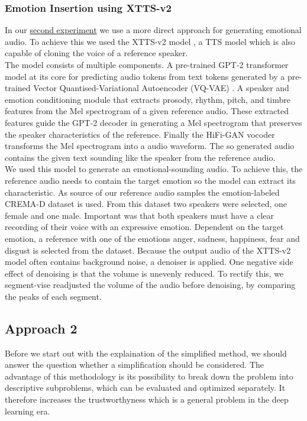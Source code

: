 \documentclass[11pt]{article}
\begin{document}
\subsubsection{Emotion Insertion using XTTS-v2}
In our \hyperref[Experiment 2]{second experiment} we use a more direct approach for generating emotional audio. To achieve this we used the XTTS-v2 model \cite{casanova2024xtts}, a TTS model which is also capable of cloning the voice of a reference speaker. \\
The model consists of multiple components. A pre-trained GPT-2 transformer model \cite{radford2019language} at its core for predicting audio tokens from text tokens generated by a pre-trained Vector Quantised-Variational Autoencoder (VQ-VAE) \cite{betker2023better, NIPS2017_7a98af17}. A speaker and emotion conditioning module that extracts prosody, rhythm, pitch, and timbre features from the Mel spectrogram of a given reference audio. These extracted features guide the GPT-2 decoder in generating a Mel spectrogram that preserves the speaker characteristics of the reference. Finally the HiFi-GAN \cite{kong2020hifi} vocoder transforms the Mel spectrogram into a audio waveform. The so generated audio contains the given text sounding like the speaker from the reference audio. \\ 
We used this model to generate an emotional-sounding audio. To achieve this, the reference audio needs to contain the target emotion so the model can extract its characteristic. As source of our reference audio samples the emotion-labeled CREMA-D \cite{cao_data} dataset is used. From this dataset two speakers were selected, one female and one male. Important was that both speakers must have a clear recording of their voice with an expressive emotion. Dependent on the target emotion, a reference with one of the emotions anger, sadness, happiness, fear and disgust is selected from the dataset. Because the output audio of the XTTS-v2 model often contains background noise, a denoiser is applied. One negative side effect of denoising is that the volume is unevenly reduced. To rectify this, we segment-vise readjusted the volume of the audio before denoising, by comparing the peaks of each segment.

\subsection{Approach 2}

Before we start out with the explaination of the simplified method, we should answer the question whether a simplification should be considered. The advantage of this methodology is its possibility to break down the problem into descriptive subproblems, which can be evaluated and optimized separately. It therefore increases the trustworthyness which is a general problem in the deep learning era.
\end{document}
